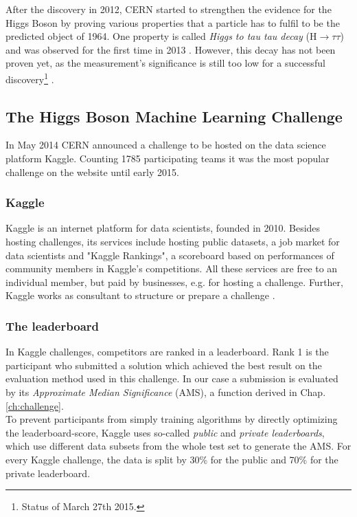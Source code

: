 After the discovery in 2012, CERN started to strengthen the evidence for the Higgs Boson by proving various properties that a particle has to fulfil to be the predicted object of 1964. One property is called \emph{Higgs to tau tau decay} ($\mathrm{H}\rightarrow\tau\tau $) and was observed for the first time in 2013 \cite{atlasNote}. However, this decay has not been proven yet, as the measurement's significance is still too low for a successful discovery\footnote{Status of March 27th 2015.} \cite{howard}.

\subsection{The Higgs Boson Machine Learning Challenge}
In May 2014 CERN announced a challenge to be hosted on the data science platform Kaggle. Counting 1785 participating teams it was the most popular challenge on the website until early 2015.

\subsubsection{Kaggle}
Kaggle is an internet platform for data scientists, founded in 2010. Besides hosting challenges, its services include hosting public datasets, a job market for data scientists and "Kaggle Rankings", a scoreboard based on performances of community members in Kaggle's competitions. All these services are free to an individual member, but paid by businesses, e.g. for hosting a challenge. Further, Kaggle works as consultant to structure or prepare a challenge \cite{kaggle}.

\subsubsection{The leaderboard}\label{sec:lb}
In Kaggle challenges, competitors are ranked in a leaderboard. Rank 1 is the participant who submitted a solution which achieved the best result on the evaluation method used in this challenge. In our case a submission is evaluated by its \emph{Approximate Median Significance} (AMS), a function derived in Chap. \ref{ch:challenge}.\\
To prevent participants from simply training algorithms by directly optimizing the leaderboard-score, Kaggle uses so-called \emph{public} and \emph{private leaderboards}, which use different data subsets from the whole test set to generate the AMS. For every Kaggle challenge, the data is split by 30\% for the public and 70\% for the private leaderboard.

